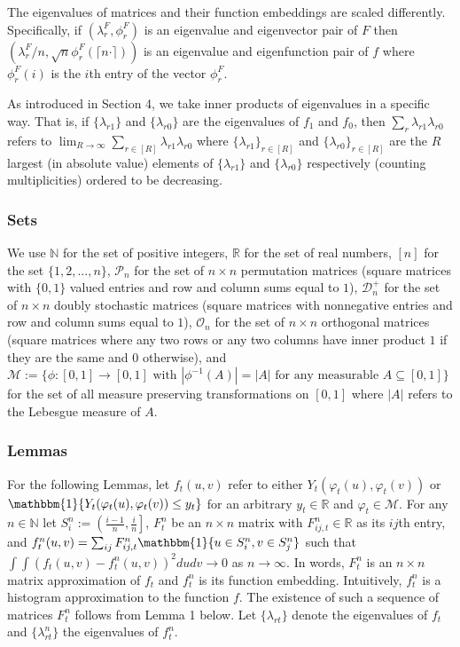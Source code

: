 \documentclass[12pt]{article}
\theoremstyle{definition}
\begin{document}
The eigenvalues of matrices and their function embeddings are scaled differently. Specifically, if $(\lambda^{F}_{r},\phi^{F}_{r})$ is an eigenvalue and eigenvector pair of $F$ then $(\lambda^{F}_{r}/n,\sqrt{n}\phi^{F}_{r}(\lceil n\cdot\rceil))$ is an eigenvalue and eigenfunction pair of $f$ where $\phi^{F}_{r}(i)$ is the $i$th entry of the vector $\phi^{F}_{r}$.  

As introduced in Section 4, we take inner products of eigenvalues in a specific way. That is, if $\{\lambda_{r1}\}$ and $\{\lambda_{r0}\}$ are the eigenvalues of $f_{1}$ and $f_{0}$, then $\sum_{r}\lambda_{r1}\lambda_{r0}$ refers to $\lim_{R \to \infty}\sum_{r \in [R]}\lambda_{r1}\lambda_{r0}$ where $\{\lambda_{r1}\}_{r \in [R]}$ and $\{\lambda_{r0}\}_{r \in [R]}$ are the $R$ largest (in absolute value) elements of $\{\lambda_{r1}\}$ and $\{\lambda_{r0}\}$ respectively (counting multiplicities) ordered to be decreasing.  

\subsubsection{Sets}
We use $\mathbb{N}$ for the set of positive integers, $\mathbb{R}$ for the set of real numbers, $[n]$ for the set $\{1,2,...,n\}$, $\mathcal{P}_{n}$ for the set of $n\times n$ permutation matrices (square matrices with $\{0,1\}$ valued entries and row and column sums equal to $1$), $\mathcal{D}_{n}^{+}$ for the set of $n\times n$ doubly stochastic matrices (square matrices with nonnegative entries and row and column sums equal to $1$), $\mathcal{O}_{n}$ for the set of $n\times n$ orthogonal matrices (square matrices where any two rows or any two columns have inner product $1$ if they are the same and $0$ otherwise), and $\mathcal{M} := \{\phi: [0,1] \to [0,1]\text{ with } |\phi^{-1}(A)| = |A| \text{ for any measurable } A \subseteq [0,1]\}$ for the set of all measure preserving transformations on $[0,1]$ where $|A|$ refers to the Lebesgue measure of $A$.  


\subsubsection{Lemmas}
For the following Lemmas, let $f_{t}(u,v)$ refer to either $Y_{t}(\varphi_{t}(u),\varphi_{t}(v))$ or $\mathbbm{1}\{Y_{t}(\varphi_{t}(u),\varphi_{t}(v)) \leq y_{t}\}$ for an arbitrary $y_{t} \in \mathbb{R}$ and $\varphi_{t} \in \mathcal{M}$. For any $n\in \mathbb{N}$ let $S_{i}^{n} := \left(\frac{i-1}{n},\frac{i}{n}\right]$, $F_{t}^{n}$ be an $n\times n$ matrix with $F_{ij,t}^{n} \in \mathbb{R}$ as its $ij$th entry, and $f_{t}^{n}(u,v) = \sum_{ij}F_{ij,t}^{n}\mathbbm{1}\{u \in S_{i}^{n}, v \in S_{j}^{n}\}$ such that $\int\int\left(f_{t}(u,v)-f_{t}^{n}(u,v)\right)^{2}dudv \to 0$ as $n\to\infty$. In words, $F_{t}^{n}$ is an $n\times n$ matrix approximation of $f_{t}$ and $f_{t}^{n}$ is its function embedding. Intuitively, $f^{n}_{t}$ is a histogram approximation to the function $f$. The existence of such a sequence of matrices $F_{t}^{n}$ follows from Lemma 1 below. Let $\{\lambda_{rt}\}$ denote the eigenvalues of  $f_{t}$ and $\{\lambda^{n}_{rt}\}$ the eigenvalues of  $f_{t}^{n}$.   
\end{document}
